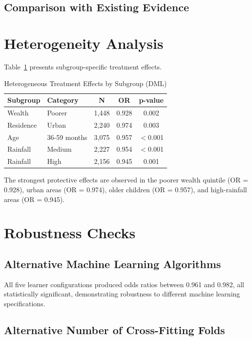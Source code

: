 \subsection{Comparison with Existing Evidence}


\section{Heterogeneity Analysis}

Table~\ref{tab:heterogeneity} presents subgroup-specific treatment effects.

\begin{table}[htbp]
	\centering
	\caption{Heterogeneous Treatment Effects by Subgroup (DML)}
	\label{tab:heterogeneity}
	\begin{tabular}{@{}llccc@{}}
		\toprule
		\textbf{Subgroup} & \textbf{Category} & \textbf{N} & \textbf{OR} & \textbf{p-value} \\
		\midrule
		Wealth & Poorer & 1,448 & 0.928 & 0.002 \\
		Residence & Urban & 2,240 & 0.974 & 0.003 \\
		Age & 36-59 months & 3,075 & 0.957 & $<$0.001 \\
		Rainfall & Medium & 2,227 & 0.954 & $<$0.001 \\
		Rainfall & High & 2,156 & 0.945 & 0.001 \\
		\bottomrule
	\end{tabular}
\end{table}

The strongest protective effects are observed in the poorer wealth quintile (OR = 0.928), urban areas (OR = 0.974), older children (OR = 0.957), and high-rainfall areas (OR = 0.945).

\section{Robustness Checks}

\subsection{Alternative Machine Learning Algorithms}

All five learner configurations produced odds ratios between 0.961 and 0.982, all statistically significant, demonstrating robustness to different machine learning specifications.

\subsection{Alternative Number of Cross-Fitting Folds}


